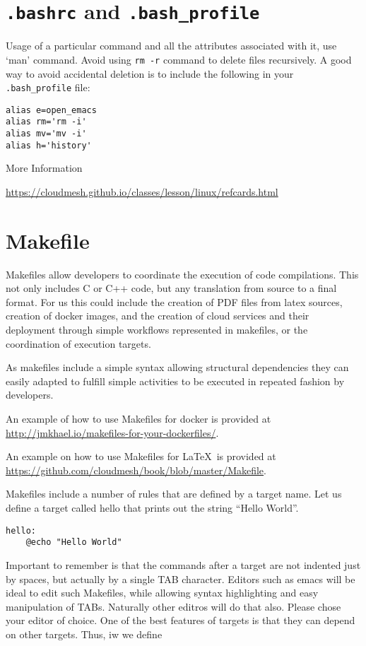 \section{\verb|.bashrc| and \verb|.bash_profile|}

Usage of a particular command and all the attributes associated with it,
use `man' command. Avoid using \verb|rm -r| command to delete files
recursively. A good way to avoid accidental deletion is to include the
following in your \verb|.bash_profile| file:

\begin{verbatim}
alias e=open_emacs
alias rm='rm -i'
alias mv='mv -i' 
alias h='history'
\end{verbatim}

More Information

\url{https://cloudmesh.github.io/classes/lesson/linux/refcards.html}

\section{Makefile}
\label{s:makefile}

Makefiles allow developers to coordinate the execution of code
compilations. This not only includes C or C++ code, but any
translation from source to a final format. For us this could include
the creation of PDF files from latex sources, creation of docker
images, and the creation of cloud services and their deployment
through simple workflows represented in makefiles, or the coordination
of execution targets.

As makefiles include a simple syntax allowing structural dependencies
they can easily adapted to fulfill simple activities to be executed in
repeated fashion by developers.

An example of how to use Makefiles for docker is provided at
\url{http://jmkhael.io/makefiles-for-your-dockerfiles/}.

An example on how to use Makefiles for \LaTeX~is provided at
\url{https://github.com/cloudmesh/book/blob/master/Makefile}.

Makefiles include a number of rules that are defined by a target
name. Let us define a target called hello that prints out the string
``Hello World''.

\begin{lstlisting} 
hello:
    @echo "Hello World"
\end{lstlisting} 

Important to remember is that the commands after a target are not
indented just by spaces, but actually by a single TAB
character. Editors such as emacs will be ideal to edit such Makefiles,
while allowing syntax highlighting and easy manipulation of
TABs. Naturally other editros will do that also. Please chose your
editor of choice. One of the best features of targets is that they can
depend on other targets. Thus, iw we define

